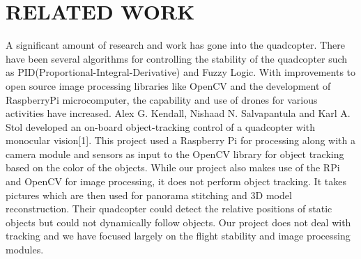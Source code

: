 \chapter{RELATED WORK} %
A significant amount of research and work has gone into the quadcopter. There have been several algorithms for controlling the stability of the quadcopter such as PID(Proportional-Integral-Derivative) and Fuzzy Logic. With improvements to open source image processing libraries like OpenCV and the development of RaspberryPi microcomputer, the capability and use of drones for various activities have increased. Alex G. Kendall, Nishaad N. Salvapantula and Karl A. Stol developed an on-board object-tracking control of a quadcopter with monocular vision[1]. This project used a Raspberry Pi for processing along with a camera module and sensors as input to the OpenCV library for object tracking based on the color of the objects. While our project also makes use of the RPi and OpenCV for image processing, it does not perform object tracking. It takes pictures which are then used for panorama stitching and 3D model reconstruction. Their quadcopter could detect the relative positions of static objects but could not dynamically follow objects. Our project does not deal with tracking and we have focused largely on the flight stability and image processing modules.\newline
